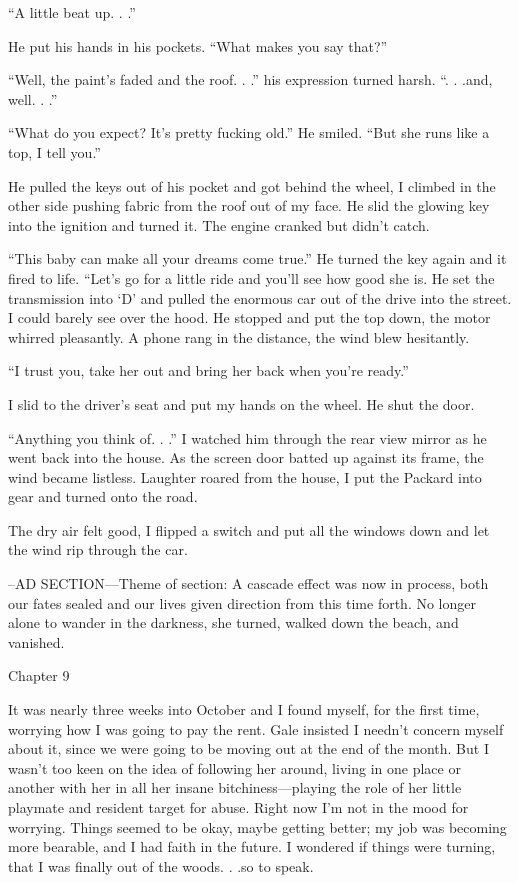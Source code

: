 ``A little beat up. . .''

He put his hands in his pockets. ``What makes you say that?''

``Well, the paint's faded and the roof. . .'' his expression turned
harsh. ``. . .and, well. . .''

``What do you expect? It's pretty fucking old.'' He smiled. ``But she
runs like a top, I tell you.''

He pulled the keys out of his pocket and got behind the wheel, I climbed
in the other side pushing fabric from the roof out of my face. He slid
the glowing key into the ignition and turned it. The engine cranked but
didn't catch.

``This baby can make all your dreams come true.'' He turned the key
again and it fired to life. ``Let's go for a little ride and you'll see
how good she is. He set the transmission into `D' and pulled the
enormous car out of the drive into the street. I could barely see over
the hood. He stopped and put the top down, the motor whirred pleasantly.
A phone rang in the distance, the wind blew hesitantly.

``I trust you, take her out and bring her back when you're ready.''

I slid to the driver's seat and put my hands on the wheel. He shut the
door.

``Anything you think of. . .'' I watched him through the rear view
mirror as he went back into the house. As the screen door batted up
against its frame, the wind became listless. Laughter roared from the
house, I put the Packard into gear and turned onto the road.

The dry air felt good, I flipped a switch and put all the windows down
and let the wind rip through the car.

--AD SECTION---Theme of section: A cascade effect was now in process,
both our fates sealed and our lives given direction from this time
forth. No longer alone to wander in the darkness, she turned, walked
down the beach, and vanished.

Chapter 9

It was nearly three weeks into October and I found myself, for the first
time, worrying how I was going to pay the rent. Gale insisted I needn't
concern myself about it, since we were going to be moving out at the end
of the month. But I wasn't too keen on the idea of following her around,
living in one place or another with her in all her insane
bitchiness---playing the role of her little playmate and resident target
for abuse. Right now I'm not in the mood for worrying. Things seemed to
be okay, maybe getting better; my job was becoming more bearable, and I
had faith in the future. I wondered if things were turning, that I was
finally out of the woods. . .so to speak.


